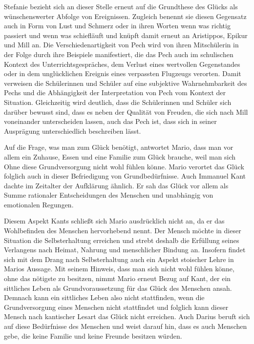 Stefanie bezieht sich an dieser Stelle erneut auf die Grundthese des Glücks als wünschenswerter Abfolge von Ereignissen. 
Zugleich benennt sie diesen Gegensatz auch in Form von Lust und Schmerz oder in ihren Worten \glqq wenn was richtig passiert\grqq{} und \glqq wenn was schiefläuft\grqq{} und knüpft damit erneut an Aristippos, Epikur und Mill an. 
Die Verschiedenartigkeit von Pech wird von ihren Mitschülerin in der Folge durch ihre Beispiele manifestiert, die das Pech auch im schulischen Kontext des Unterrichtsgespräches, dem Verlust eines wertvollen Gegenstandes oder in dem unglücklichen Ereignis eines verpassten Flugzeugs verorten. 
Damit verweisen die Schülerinnen und Schüler auf eine subjektive Wahrnehmbarkeit des Pechs und die Abhängigkeit der Interpretation von Pech vom Kontext der Situation. 
Gleichzeitig wird deutlich, dass die Schülerinnen und Schüler sich darüber bewusst sind, dass es neben der Qualität von Freuden, die sich nach Mill voneinander unterscheiden lassen, auch das Pech ist, dass sich in seiner Ausprägung unterschiedlich beschreiben lässt.

Auf die Frage, was man zum Glück benötigt, antwortet Mario, dass man vor allem ein Zuhause, Essen und eine Familie zum Glück brauche, weil man sich Ohne diese Grundversorgung nicht wohl fühlen könne.
 Mario verortet das Glück folglich auch in dieser Befriedigung von Grundbedürfnisse. 
 Auch Immanuel Kant dachte im Zeitalter der Aufklärung ähnlich. 
 Er sah das Glück vor allem als Summe rationaler Entscheidungen des Menschen und unabhängig von emotionalen Regungen. 
 
Diesem Aspekt Kants schließt sich Mario ausdrücklich nicht an, da er das Wohlbefinden des Menschen hervorhebend nennt. 
Der Mensch möchte in dieser Situation die Selbsterhaltung erreichen und strebt deshalb die Erfüllung seines Verlangens nach Heimat, Nahrung und menschlicher Bindung an. 
Insofern findet sich mit dem Drang nach Selbsterhaltung auch ein Aspekt stoischer Lehre in Marios Aussage. 
Mit seinem Hinweis, dass man sich nicht wohl fühlen könne, ohne das nötigste zu besitzen, nimmt Mario erneut Bezug auf Kant, der ein sittliches Leben als Grundvoraussetzung für das Glück des Menschen ansah. 
Demnach kann ein sittliches Leben also nicht stattfinden, wenn die Grundversorgung eines Menschen nicht stattfindet und folglich kann dieser Mensch nach kantischer Lesart das Glück nicht erreichen. 
Auch Darius beruft sich auf diese Bedürfnisse des Menschen und weist darauf hin, dass es auch Menschen gebe, die keine Familie und keine Freunde besitzen würden. 

